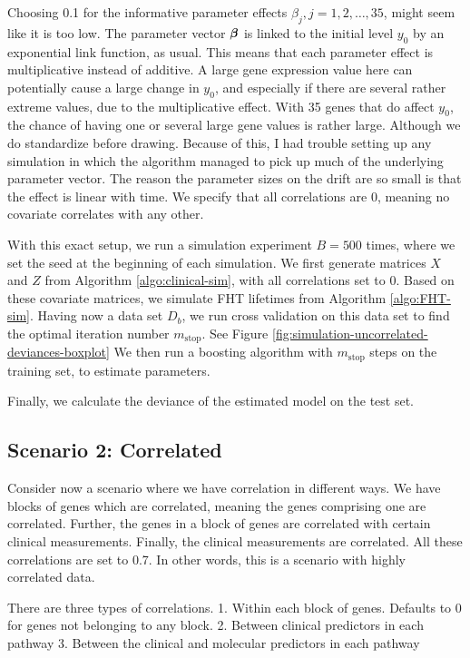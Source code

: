 Choosing 0.1 for the informative parameter effects $\beta_j,j=1,2,\ldots,35$, might seem like it is too low.
The parameter vector $\boldsymbol{\beta}$ is linked to the initial level $y_0$ by an exponential link function, as usual.
This means that each parameter effect is multiplicative instead of additive.
A large gene expression value here can potentially cause a large change in $y_0$, and especially if there are several rather extreme values, due to the multiplicative effect.
With 35 genes that do affect $y_0$, the chance of having one or several large gene values is rather large.
Although we do standardize before drawing.
Because of this, I had trouble setting up any simulation in which the algorithm managed to pick up much of the underlying parameter vector.
The reason the parameter sizes on the drift are so small is that the effect is linear with time.
We specify that all correlations are 0, meaning no covariate correlates with any other.

With this exact setup, we run a simulation experiment $B=500$ times, where we set the seed at the beginning of each simulation.
We first generate matrices $X$ and $Z$ from Algorithm \ref{algo:clinical-sim}, with all correlations set to 0.
Based on these covariate matrices, we simulate FHT lifetimes from Algorithm \ref{algo:FHT-sim}.
Having now a data set $D_b$, we run cross validation on this data set to find the optimal iteration number $m_{\text{stop}}$.
See Figure \ref{fig:simulation-uncorrelated-deviances-boxplot}
We then run a boosting algorithm with $m_{\text{stop}}$ steps on the training set, to estimate parameters.


Finally, we calculate the deviance of the estimated model on the test set.

\subsection{Scenario 2: Correlated}
Consider now a scenario where we have correlation in different ways.
We have blocks of genes which are correlated, meaning the genes comprising one are correlated.
Further, the genes in a block of genes are correlated with certain clinical measurements.
Finally, the clinical measurements are correlated.
All these correlations are set to 0.7.
In other words, this is a scenario with highly correlated data.

There are three types of correlations.
1. Within each block of genes. Defaults to 0 for genes not belonging to any block.
2. Between clinical predictors in each pathway
3. Between the clinical and molecular predictors in each pathway

